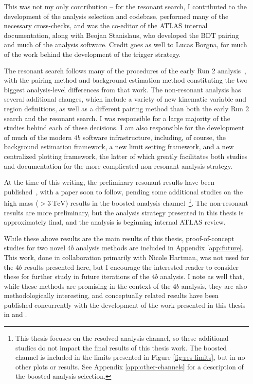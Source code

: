 This was not my only contribution -- for the resonant search, I contributed to the development of the analysis selection 
and codebase, performed many of the necessary cross-checks, and was the co-editor of the ATLAS internal documentation, 
along with Beojan Stanislaus, who developed the BDT pairing and much of the analysis software. Credit goes as well to 
Lucas Borgna, for much of the work behind the development of the trigger strategy.

The resonant search follows many of the procedures of the early Run 2 analysis~\cite{EXOT-2016-31}, 
with the pairing method and background estimation method constituting the two biggest analysis-level differences 
from that work. The non-resonant analysis has several additional changes, which include a variety of new kinematic variable 
and region definitions, as well as a different pairing method than both the early Run 2 search and the resonant search. 
I was responsible for a large majority of the studies behind each of these decisions. I am also responsible for the 
development of much of the modern $4b$ software infrastructure, including, of course, the background estimation framework, 
a new limit setting framework, and a new centralized plotting framework, the latter of which greatly facilitates 
both studies and documentation for the more complicated non-resonant analysis strategy.

At the time of this writing, the preliminary resonant results have been published~\cite{ATLAS-CONF-2021-035}, with a 
paper soon to follow, pending some additional studies on the high mass ($>\SI{3}{\TeV}$) results in the boosted 
analysis channel~\footnote{This thesis focuses on the resolved analysis channel, so these additional studies do 
not impact the final results of this thesis work. The boosted channel is included in the limits presented 
in Figure \ref{fig:res-limits}, but in no other plots or results. See Appendix \ref{app:other-channels} for a description 
of the boosted analysis selection.}. The non-resonant results are more preliminary, but the analysis strategy presented 
in this thesis is approximately final, and the analysis is beginning internal ATLAS review.

While these above results are the main results of this thesis, proof-of-concept studies for two novel $4b$ analysis methods 
are included in Appendix \ref{app:future}. This work, done in collaboration primarily with 
Nicole Hartman, was not used for the $4b$ results presented here, but I encourage the interested reader to consider 
these for further study in future iterations of the $4b$ analysis. I note as well that, while these methods are 
promising in the context of the $4b$ analysis, they are also methodologically interesting, and conceptually 
related results have been published concurrently with the development of the work presented in this thesis in 
\cite{SPANet} and \cite{Astro-NSF}. 
